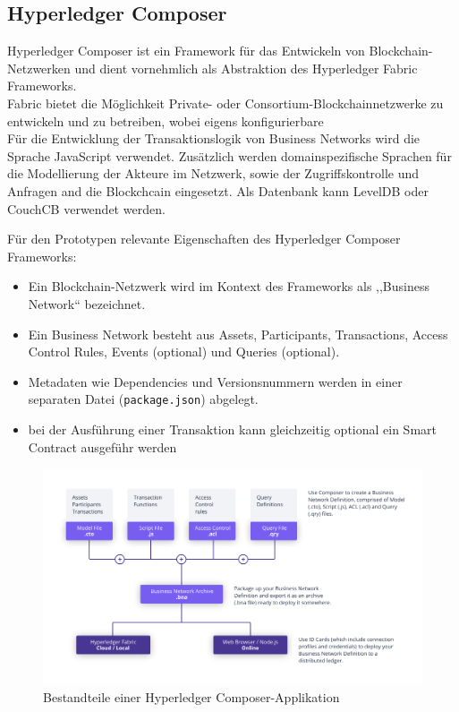 \subsection{Hyperledger Composer}
        Hyperledger Composer ist ein Framework für das Entwickeln von Blockchain-Netzwerken und dient vornehmlich als Abstraktion des Hyperledger Fabric Frameworks. 
        \medskip\\
        Fabric bietet die Möglichkeit Private- oder Consortium-Blockchainnetzwerke zu entwickeln und zu betreiben, wobei eigens konfigurierbare 
        \medskip\\
        \noindent Für die Entwicklung der Transaktionslogik von Business Networks wird die Sprache JavaScript verwendet. 
        Zusätzlich werden domainspezifische Sprachen für die Modellierung der Akteure im Netzwerk, sowie der Zugriffskontrolle und Anfragen and die Blockchcain eingesetzt.
        Als Datenbank kann LevelDB oder CouchCB verwendet werden. 
        
        \noindent Für den Prototypen relevante Eigenschaften des Hyperledger Composer Frameworks:
        \begin{itemize}[noitemsep]
            \item Ein Blockchain-Netzwerk wird im Kontext des Frameworks als ,,Business Network`` bezeichnet. 
            \item Ein Business Network besteht aus Assets, Participants, Transactions, Access Control Rules, Events (optional) und Queries (optional).
            \item Metadaten wie Dependencies und Versionsnummern werden in einer separaten Datei (\colorbox{light-gray}{\lstinline|package.json|}) abgelegt.
            \item bei der Ausführung einer Transaktion kann gleichzeitig optional ein Smart Contract ausgeführ werden
        \end{itemize}
        
        \begin{figure}[H]
    		\centering
    		\includegraphics[width=\textwidth]{graphics/Composer-Diagram.png}
    		\caption[Bestandteile einer Hyperledger Composer-Applikation]{Bestandteile einer Hyperledger Composer-Applikation\cite{ComposerDocs}}
    		\label{fig:composer_arch}
    	\end{figure}
        
